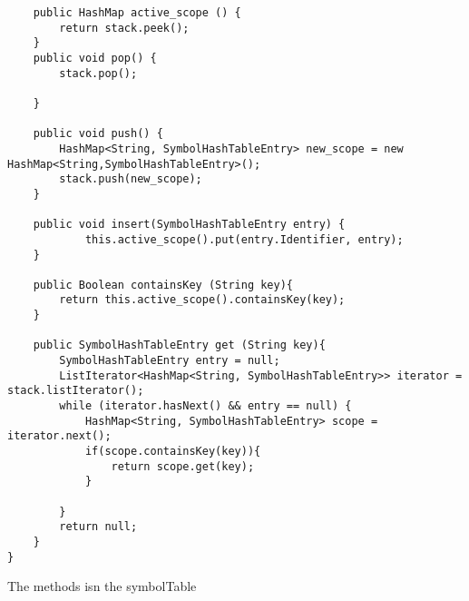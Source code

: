 \begin{listing}[htb!]
    \begin{verbatim}
    public HashMap active_scope () {
        return stack.peek();
    }
    public void pop() {
        stack.pop();
        
    }

    public void push() {
        HashMap<String, SymbolHashTableEntry> new_scope = new HashMap<String,SymbolHashTableEntry>();
        stack.push(new_scope);
    }

    public void insert(SymbolHashTableEntry entry) {
            this.active_scope().put(entry.Identifier, entry);
    }

    public Boolean containsKey (String key){
        return this.active_scope().containsKey(key);
    }

    public SymbolHashTableEntry get (String key){
        SymbolHashTableEntry entry = null;
        ListIterator<HashMap<String, SymbolHashTableEntry>> iterator = stack.listIterator();
        while (iterator.hasNext() && entry == null) {
            HashMap<String, SymbolHashTableEntry> scope = iterator.next();
            if(scope.containsKey(key)){
                return scope.get(key);
            }
            
        }
        return null;   
    }   
}
\end{verbatim}
\caption{The methods isn the symbolTable}
\label{lst:SymboltableMethods}
\end{listing}

